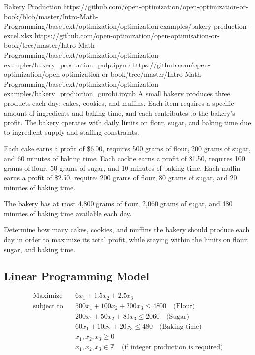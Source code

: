 \newpage
\begin{examplewithallcode}{Bakery Production}
{https://github.com/open-optimization/open-optimization-or-book/blob/master/Intro-Math-Programming/baseText/optimization/optimization-examples/bakery-production-excel.xlsx}
{https://github.com/open-optimization/open-optimization-or-book/tree/master/Intro-Math-Programming/baseText/optimization/optimization-examples/bakery_production_pulp.ipynb}
{https://github.com/open-optimization/open-optimization-or-book/tree/master/Intro-Math-Programming/baseText/optimization/optimization-examples/bakery_production_gurobi.ipynb}
\label{example:bakery-production}
A small bakery produces three products each day: cakes, cookies, and muffins. Each item requires a specific amount of ingredients and baking time, and each contributes to the bakery’s profit. The bakery operates with daily limits on flour, sugar, and baking time due to ingredient supply and staffing constraints.

Each cake earns a profit of \$6.00, requires 500 grams of flour, 200 grams of sugar, and 60 minutes of baking time. Each cookie earns a profit of \$1.50, requires 100 grams of flour, 50 grams of sugar, and 10 minutes of baking time. Each muffin earns a profit of \$2.50, requires 200 grams of flour, 80 grams of sugar, and 20 minutes of baking time.

The bakery has at most 4,800 grams of flour, 2,060 grams of sugar, and 480 minutes of baking time available each day.

Determine how many cakes, cookies, and muffins the bakery should produce each day in order to maximize its total profit, while staying within the limits on flour, sugar, and baking time.

\subsection*{Linear Programming Model}

\[
\begin{aligned}
\text{Maximize} \quad & 6x_1 + 1.5x_2 + 2.5x_3 \\
\text{subject to} \quad
& 500x_1 + 100x_2 + 200x_3 \leq 4800 \quad \text{(Flour)} \\
& 200x_1 + 50x_2 + 80x_3 \leq 2060 \quad \text{(Sugar)} \\
& 60x_1 + 10x_2 + 20x_3 \leq 480 \quad \text{(Baking time)} \\
& x_1, x_2, x_3 \geq 0 \\
& x_1, x_2, x_3 \in \mathbb{Z} \quad \text{(if integer production is required)}
\end{aligned}
\]
\end{examplewithallcode}

